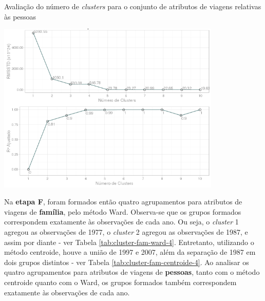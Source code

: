 \clearpage

\begin{grafico}[htb]%
    \caption{\label{graf:rmsstd-r2-cluster-pess-total}Avaliação do número de \textit{clusters} para o conjunto de atributos de viagens relativas às pessoas}%
    \begin{center}%
        \includegraphics[width=0.8\textwidth]{./imagens/No-clusters-R2-RMSSTD-pessoas.png}%
    \end{center}%
\end{grafico}%

Na \textbf{etapa F}, foram formados então quatro agrupamentos para atributos de viagens de \textbf{família}, pelo método Ward. Observa-se que os grupos formados correspondem exatamente às observações de cada ano. 
Ou seja, o \textit{cluster} 1 agregou as observações de 1977, o \textit{cluster} 2 agregou as observações de 1987, e assim por diante - ver Tabela \ref{tab:cluster-fam-ward-4}. Entretanto, utilizando o método centroide, houve a união de 1997 e 2007, além da separação de 1987 em dois grupos distintos - ver Tabela \ref{tab:cluster-fam-centroide-4}.
Ao analisar os quatro agrupamentos para atributos de viagens de \textbf{pessoas}, tanto com o método centroide quanto com o Ward, os grupos formados também correspondem exatamente às observações de cada ano. 

